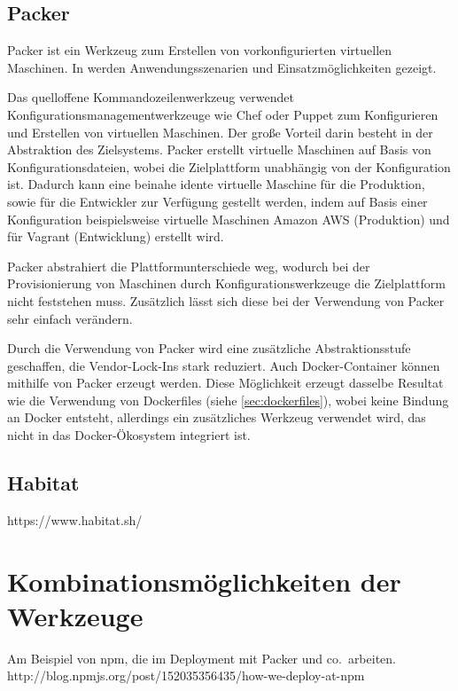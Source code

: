 \subsection{Packer}
\label{sub:packer}
Packer ist ein Werkzeug zum Erstellen von vorkonfigurierten virtuellen Maschinen.
In \autocite{Packer:online} werden Anwendungsszenarien und Einsatzmöglichkeiten gezeigt.

Das quelloffene Kommandozeilenwerkzeug verwendet Konfigurationsmanagementwerkzeuge wie Chef oder Puppet zum Konfigurieren und Erstellen von virtuellen Maschinen.
Der große Vorteil darin besteht in der Abstraktion des Zielsystems.
Packer erstellt virtuelle Maschinen auf Basis von Konfigurationsdateien, wobei die Zielplattform unabhängig von der Konfiguration ist.
Dadurch kann eine beinahe idente virtuelle Maschine für die Produktion, sowie für die Entwickler zur Verfügung gestellt werden, indem auf Basis einer Konfiguration beispielsweise virtuelle Maschinen Amazon AWS (Produktion) und für Vagrant (Entwicklung) erstellt wird.

Packer abstrahiert die Plattformunterschiede weg, wodurch bei der Provisionierung von Maschinen durch Konfigurationswerkzeuge die Zielplattform nicht feststehen muss.
Zusätzlich lässt sich diese bei der Verwendung von Packer sehr einfach verändern.

Durch die Verwendung von Packer wird eine zusätzliche Abstraktionsstufe geschaffen, die Vendor-Lock-Ins stark reduziert.
Auch Docker-Container können mithilfe von Packer erzeugt werden.
Diese Möglichkeit erzeugt dasselbe Resultat wie die Verwendung von Dockerfiles (siehe \cref{sec:dockerfiles}), wobei keine Bindung an Docker entsteht, allerdings ein zusätzliches Werkzeug verwendet wird, das nicht in das Docker-Ökosystem integriert ist.

\subsection{Habitat}
\label{sub:habitat}
https://www.habitat.sh/


\section{Kombinationsmöglichkeiten der Werkzeuge}
\label{sec:werkzeugkombinationsmoeglichkeiten}
Am Beispiel von npm, die im Deployment mit Packer und co.\ arbeiten.
http://blog.npmjs.org/post/152035356435/how-we-deploy-at-npm
